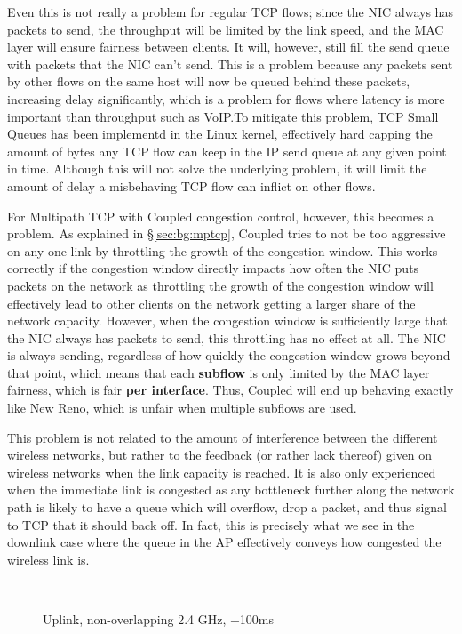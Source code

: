 Even this is not really a problem for regular TCP flows; since the NIC always
has packets to send, the throughput will be limited by the link speed, and the
MAC layer will ensure fairness between clients. It will, however, still fill the
send queue with packets that the NIC can't send. This is a problem because any
packets sent by other flows on the same host will now be queued behind these
packets, increasing delay significantly, which is a problem for flows where
latency is more important than throughput such as VoIP.\@ To mitigate this 
problem, TCP Small Queues has been implementd in the Linux kernel, effectively 
hard capping the amount of bytes any TCP flow can keep in the IP send queue at 
any given point in time. Although this will not solve the underlying problem, it 
will limit the amount of delay a misbehaving TCP flow can inflict on other flows.

For Multipath TCP with Coupled congestion control, however, this becomes a
problem. As explained in \S\ref{sec:bg:mptcp}, Coupled tries to not be too 
aggressive on any one link by throttling the growth of the congestion window.
This works correctly if the congestion window directly impacts how often the NIC 
puts packets on the network as throttling the growth of the congestion window 
will effectively lead to other clients on the network getting a larger share of 
the network capacity. However, when the congestion window is sufficiently large 
that the NIC always has packets to send, this throttling has no effect at all. 
The NIC is always sending, regardless of how quickly the congestion window grows 
beyond that point, which means that each \textbf{subflow} is only limited by the 
MAC layer fairness, which is fair \textbf{per interface}. Thus, Coupled will end 
up behaving exactly like New Reno, which is unfair when multiple subflows are 
used.

This problem is not related to the amount of interference between the different
wireless networks, but rather to the feedback (or rather lack thereof) given on
wireless networks when the link capacity is reached. It is also only experienced
when the immediate link is congested as any bottleneck further along the network
path is likely to have a queue which will overflow, drop a packet, and thus
signal to TCP that it should back off. In fact, this is precisely what we see in
the downlink case where the queue in the AP effectively conveys how congested
the wireless link is.

\begin{figure}[h]
 \centering
 \subfloat[][CDF] {\
   \label{graph:fairness-rtt-up-cdf}
 }
 \\
 \subfloat[][Multipath TCP time plot] {\
   \label{graph:fairness-rtt-up-close}
 }
 \caption{Uplink, non-overlapping 2.4 GHz, +100ms}\label{graph:fairness-rtt-up}
\end{figure}

